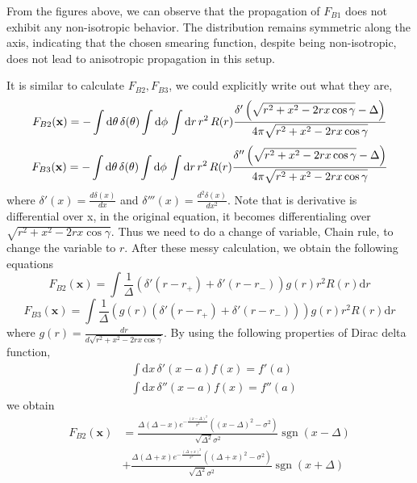 \documentclass[a4paper,12pt]{article}
\begin{document}
From the figures above, we can observe that the propagation of $F_{B1}$ does not exhibit any non-isotropic behavior. The distribution remains symmetric along the axis, indicating that the chosen smearing function, despite being non-isotropic, does not lead to anisotropic propagation in this setup.

It is similar to calculate \(F_{B2}, F_{B3}\), we could explicitly write out what they are, 
\begin{equation}
    F_{B2}(\mathbf{x}) = - \int \mathrm{d}\theta\, \delta(\theta)  \int \mathrm{d}\phi\, \int \mathrm{d}r\, r^2 \, R(r) \frac{\delta '\left(\sqrt{r^2 + x^2 - 2rx \cos\gamma} - \Delta\right)}{4\pi \sqrt{r^2 + x^2 - 2rx \cos\gamma}} \notag \\
\end{equation}
\begin{equation}
    F_{B3}(\mathbf{x}) = - \int \mathrm{d}\theta\, \delta(\theta)  \int \mathrm{d}\phi\, \int \mathrm{d}r\, r^2 \, R(r) \frac{\delta ''\left(\sqrt{r^2 + x^2 - 2rx \cos\gamma} - \Delta\right)}{4\pi \sqrt{r^2 + x^2 - 2rx \cos\gamma}} \notag \\
\end{equation}
where \(\displaystyle \delta '(x) = \frac{d \delta(x)}{d x}\) and \(\displaystyle \delta '''(x) = \frac{d^2 \delta(x)}{d x^2}\). Note that is derivative is differential over x, in the original equation, it becomes differentialing over \(\sqrt{r^2 + x^2 - 2rx \cos{\gamma}}\). Thus we need to do a change of variable, Chain rule, to change the variable to \(r\). After these messy calculation, we obtain the following equations
\begin{equation}
    F_{B2}(\mathbf{x}) = \int \frac{1}{\Delta}\left(\delta '(r - r_+) + \delta '(r - r_-) \right)g(r) r^2 R(r) \mathrm{d} r 
\end{equation}
\begin{equation}
    F_{B3}(\mathbf{x}) = \int \frac{1}{\Delta}\left(g(r) (\delta '(r - r_+) + \delta '(r - r_-)) \right) g(r) r^2 R(r) \mathrm{d} r 
\end{equation}
where \(g(r) = \frac{d r}{d \sqrt{r^2 + x^2 - 2rx \cos{\gamma}}}\).
By using the following properties of Dirac delta function,
\begin{align}
    &\int \mathrm{d} x \, \delta '(x-a) f(x) = f'(a)\\
    &\int \mathrm{d} x \, \delta ''(x-a) f(x) = f''(a)
\end{align}
we obtain 
\begin{align*}
    F_{B2}(\mathbf{x}) &= \frac{\Delta  (\Delta -x) e^{-\frac{(x-\Delta )^2}{\sigma ^2}} \left((x-\Delta )^2-\sigma ^2\right)}{\sqrt{\Delta ^2} \sigma ^2}\operatorname{sgn}(x - \Delta)\\ &+\frac{\Delta  (\Delta +x) e^{-\frac{(\Delta +x)^2}{\sigma ^2}} \left((\Delta +x)^2-\sigma ^2\right)}{\sqrt{\Delta ^2} \sigma ^2} \operatorname{sgn}(x + \Delta)
\end{align*}
\end{document}
